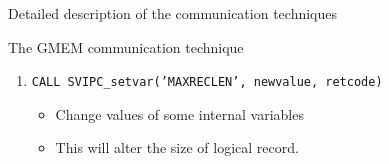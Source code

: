 \begin{section}{Detailed description of the communication techniques}
\begin{subsection}{The GMEM communication technique}
\begin{enumerate}
\item {\tt CALL SVIPC\_setvar('MAXRECLEN', newvalue, retcode)}
 \begin{itemize}
     \item Change values of some internal variables
     \item This will alter the size of logical record.
 \end{itemize}

\end{enumerate}

\end{subsection}

\end{section}